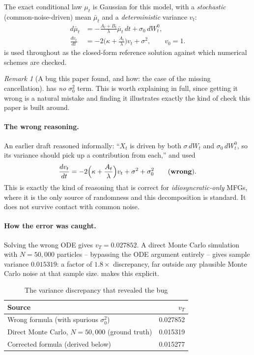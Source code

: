 \documentclass[11pt]{article}
\theoremstyle{remark}
\newtheorem{remark}[theorem]{Remark}
\begin{document}
The exact conditional law $\mu_t$ is Gaussian for this model, with a
\emph{stochastic} (common-noise-driven) mean $\bar\mu_t$ and a
\emph{deterministic} variance $v_t$:
\begin{align}
    d\bar\mu_t &= -\frac{A_t+B_t}{\lambda}\bar\mu_t\, dt + \sigma_0\, dW_t^0,
    \label{eq:conditional-mean-sde} \\
    \frac{dv_t}{dt} &= -2\Big(\kappa+\frac{A_t}{\lambda}\Big)v_t + \sigma^2,
    \qquad v_0 = 1.
    \label{eq:conditional-var-ode}
\end{align}
 is used throughout as the closed-form reference
solution against which numerical schemes are checked.

\begin{remark}[A bug this paper found, and how: the case of the missing cancellation]
\label{rem:variance-subtlety}
 has \emph{no} $\sigma_0^2$ term. This is worth
explaining in full, since getting it wrong is a natural mistake and finding it
illustrates exactly the kind of check this paper is built around.

\paragraph{The wrong reasoning.} An earlier draft reasoned informally: ``$X_t$ is
driven by both $\sigma\,dW_t$ and $\sigma_0\,dW_t^0$, so its variance should pick
up a contribution from each,'' and used
\[
    \frac{dv_t}{dt} = -2\Big(\kappa+\frac{A_t}{\lambda}\Big)v_t + \sigma^2 +
    \sigma_0^2 \qquad \text{(\textbf{wrong})}.
\]
This is exactly the kind of reasoning that is correct for \emph{idiosyncratic-only}
MFGs, where it is the only source of randomness and this decomposition is standard.
It does not survive contact with common noise.

\paragraph{How the error was caught.} Solving the wrong ODE gives $v_T = 0.027852$.
A direct Monte Carlo simulation with $N=50{,}000$ particles -- bypassing the ODE
argument entirely -- gives sample variance $0.015319$: a factor of $1.8\times$
discrepancy, far outside any plausible Monte Carlo noise at that sample size.
 makes this explicit.

\begin{table}[ht]
\centering
\caption{The variance discrepancy that revealed the bug}
\label{tab:variance-bug}
\begin{tabular}{lr}
\toprule
\textbf{Source} & $v_T$ \\
\midrule
Wrong formula (with spurious $\sigma_0^2$) & 0.027852 \\
Direct Monte Carlo, $N=50{,}000$ (ground truth) & 0.015319 \\
Corrected formula (derived below) & 0.015277 \\
\bottomrule
\end{tabular}
\end{table}


\end{remark}
\end{document}
